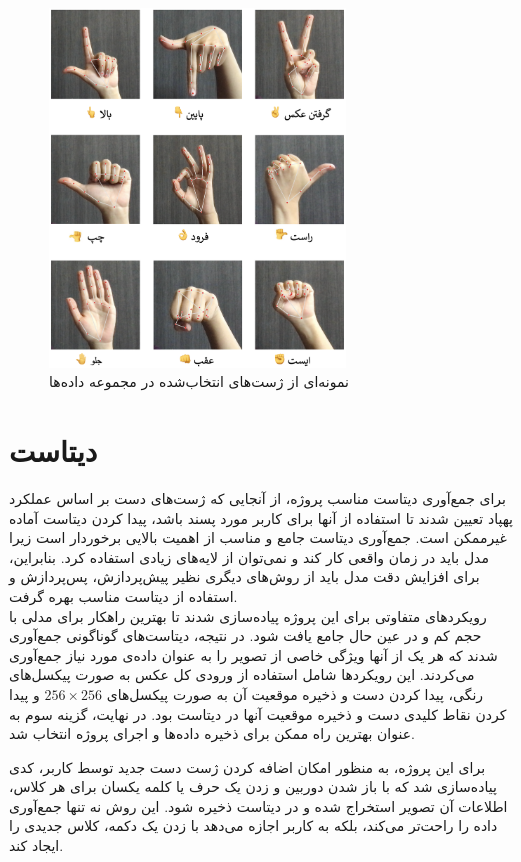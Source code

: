 \begin{figure}[h]
    \centering
    \includegraphics[width=0.7\textwidth]{gestures.png}
    \caption{نمونه‌ای از ژست‌های انتخاب‌شده در مجموعه داده‌ها}
    \label{t}
\end{figure}

\section{دیتاست}
برای جمع‌آوری دیتاست مناسب پروژه، از آنجایی که ژست‌های دست بر اساس عملکرد پهپاد تعیین شدند تا استفاده از آنها برای کاربر مورد پسند باشد، پیدا کردن دیتاست آماده غیرممکن است. جمع‌آوری دیتاست جامع و مناسب از اهمیت
 بالایی برخوردار است زیرا مدل باید در زمان واقعی کار کند و نمی‌توان از لایه‌های زیادی استفاده کرد. بنابراین، برای افزایش دقت مدل باید از روش‌های دیگری نظیر پیش‌پردازش، پس‌پردازش و استفاده از دیتاست مناسب بهره گرفت.
\\
رویکردهای متفاوتی برای این پروژه پیاده‌سازی شدند تا بهترین راهکار برای مدلی با حجم کم و در عین حال جامع یافت شود. در نتیجه، دیتاست‌های گوناگونی جمع‌آوری شدند که هر یک از آنها ویژگی خاصی از تصویر
 را به عنوان داده‌ی مورد نیاز جمع‌آوری می‌کردند. این رویکردها شامل استفاده از ورودی کل عکس به صورت پیکسل‌های رنگی، پیدا کردن دست و ذخیره موقعیت آن به صورت پیکسل‌های $256 \times 256$ و پیدا کردن نقاط کلیدی دست و ذخیره موقعیت آنها در دیتاست بود. در نهایت، گزینه سوم به عنوان بهترین راه ممکن برای ذخیره داده‌ها و اجرای پروژه انتخاب شد.

برای این پروژه، به منظور امکان اضافه کردن ژست دست جدید توسط کاربر، کدی پیاده‌سازی شد که با باز شدن دوربین و زدن یک حرف 
یا کلمه یکسان برای هر کلاس، اطلاعات آن تصویر استخراج شده و در دیتاست ذخیره شود. این روش نه تنها جمع‌آوری داده را راحت‌تر می‌کند، بلکه به کاربر اجازه می‌دهد با زدن یک دکمه، کلاس جدیدی را ایجاد کند.


